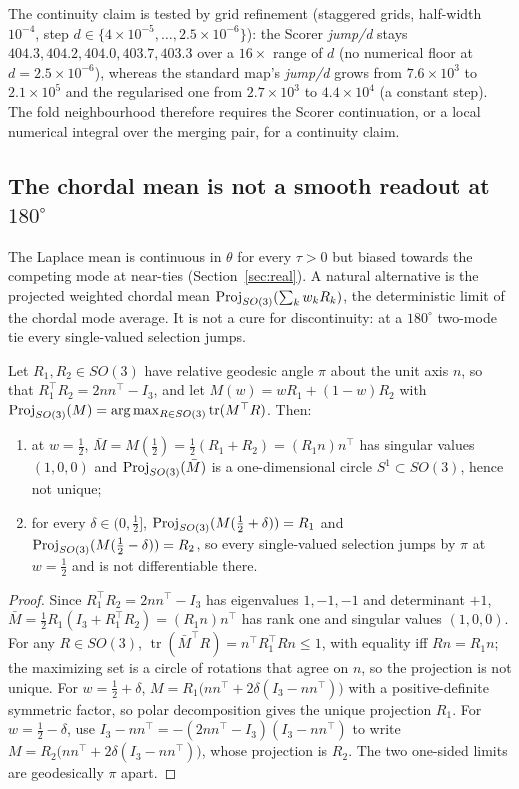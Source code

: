 The continuity claim is tested by grid refinement (staggered grids, half-width $10^{-4}$, step $d\in\{4\times10^{-5},\ldots,2.5\times10^{-6}\}$): the Scorer \emph{jump/d} stays $404.3,404.2,404.0,403.7,403.3$ over a $16\times$ range of $d$ (no numerical floor at $d=2.5\times10^{-6}$), whereas the standard map's \emph{jump/d} grows from $7.6\times10^{3}$ to $2.1\times10^{5}$ and the regularised one from $2.7\times10^{3}$ to $4.4\times10^{4}$ (a constant step). The fold neighbourhood therefore requires the Scorer continuation, or a local numerical integral over the merging pair, for a continuity claim.

\subsection{The chordal mean is not a smooth readout at \texorpdfstring{$180^\circ$}{180 deg}}\label{sec:chordal}

The Laplace mean is continuous in $\theta$ for every $\tau>0$ but biased towards the competing mode at near-ties (Section~\ref{sec:real}). A natural alternative is the projected weighted chordal mean $\operatorname{Proj}_{SO(3)}(\sum_kw_kR_k)$, the deterministic limit of the chordal mode average. It is not a cure for discontinuity: at a $180^\circ$ two-mode tie every single-valued selection jumps.

\begin{proposition}\label{prop:chordal}
Let $R_1,R_2\in SO(3)$ have relative geodesic angle $\pi$ about the unit axis $n$, so that $R_1^\top R_2=2nn^\top-I_3$, and let $M(w)=wR_1+(1-w)R_2$ with $\operatorname{Proj}_{SO(3)}(M)=\arg\max_{R\in SO(3)}\operatorname{tr}(M^\top R)$. Then:
\begin{enumerate}
\item at $w=\frac12$, $\bar M=M(\frac12)=\frac12(R_1+R_2)=(R_1n)n^\top$ has singular values $(1,0,0)$ and $\operatorname{Proj}_{SO(3)}(\bar M)$ is a one-dimensional circle $S^1\subset SO(3)$, hence not unique;
\item for every $\delta\in(0,\frac12]$, $\operatorname{Proj}_{SO(3)}(M(\frac12+\delta))=R_1$ and $\operatorname{Proj}_{SO(3)}(M(\frac12-\delta))=R_2$, so every single-valued selection jumps by $\pi$ at $w=\frac12$ and is not differentiable there.
\end{enumerate}
\end{proposition}

\begin{proof}
Since $R_1^\top R_2=2nn^\top-I_3$ has eigenvalues $1,-1,-1$ and determinant $+1$, $\bar M=\frac12R_1(I_3+R_1^\top R_2)=(R_1n)n^\top$ has rank one and singular values $(1,0,0)$. For any $R\in SO(3)$, $\operatorname{tr}(\bar M^\top R)=n^\top R_1^\top Rn\le1$, with equality iff $Rn=R_1n$; the maximizing set is a circle of rotations that agree on $n$, so the projection is not unique. For $w=\frac12+\delta$, $M=R_1\big(nn^\top+2\delta(I_3-nn^\top)\big)$ with a positive-definite symmetric factor, so polar decomposition gives the unique projection $R_1$. For $w=\frac12-\delta$, use $I_3-nn^\top=-(2nn^\top-I_3)(I_3-nn^\top)$ to write $M=R_2\big(nn^\top+2\delta(I_3-nn^\top)\big)$, whose projection is $R_2$. The two one-sided limits are geodesically $\pi$ apart.
\end{proof}

